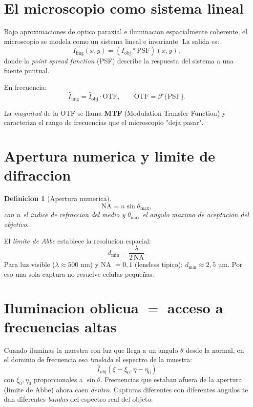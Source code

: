 \documentclass[11pt,a4paper,twoside,openright]{book}
\newtheorem{definicion}{Definicion}[chapter]
\begin{document}
\section{El microscopio como sistema lineal}

Bajo aproximaciones de optica paraxial e iluminacion espacialmente coherente, el microscopio se modela como un sistema lineal e invariante. La salida es:
\begin{equation}
I_{\text{img}}(x,y) = (I_{\text{obj}} * \mathrm{PSF})(x,y),
\end{equation}
donde la \emph{point spread function} (PSF) describe la respuesta del sistema a una fuente puntual.

En frecuencia:
\begin{equation}
\hat{I}_{\text{img}} = \hat{I}_{\text{obj}} \cdot \mathrm{OTF}, \qquad \mathrm{OTF} = \mathcal{F}\{\mathrm{PSF}\}.
\end{equation}

La \emph{magnitud} de la OTF se llama \textbf{MTF} (Modulation Transfer Function) y caracteriza el rango de frecuencias que el microscopio "deja pasar".

\section{Apertura numerica y limite de difraccion}

\begin{definicion}[Apertura numerica]
\begin{equation}
\mathrm{NA} = n \sin\theta_{\max},
\end{equation}
con $n$ el indice de refraccion del medio y $\theta_{\max}$ el angulo maximo de aceptacion del objetivo.
\end{definicion}

El \emph{limite de Abbe} establece la resolucion espacial:
\begin{equation}
d_{\min} = \frac{\lambda}{2\,\mathrm{NA}}.
\end{equation}
Para luz visible ($\lambda \approx 500$ nm) y NA $= 0{,}1$ (lensless tipico): $d_{\min} \approx 2{,}5$ µm. Por eso una sola captura no resuelve celulas pequeñas.

\section{Iluminacion oblicua $=$ acceso a frecuencias altas}

Cuando iluminas la muestra con luz que llega a un angulo $\theta$ desde la normal, en el dominio de frecuencia eso \emph{traslada} el espectro de la muestra:
\begin{equation}
\hat{I}_{\text{obj}}(\xi - \xi_0, \eta - \eta_0)
\end{equation}
con $\xi_0, \eta_0$ proporcionales a $\sin\theta$. Frecuencias que estaban afuera de la apertura (limite de Abbe) ahora caen \emph{dentro}. Capturas diferentes con diferentes angulos te dan diferentes \emph{bandas} del espectro real del objeto.
\end{document}
